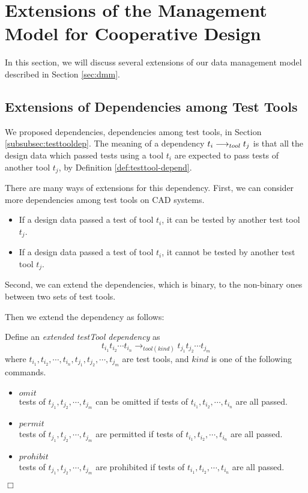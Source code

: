 \section{Extensions of the Management Model for Cooperative Design}
\label{sec:extension}
In this section, we will discuss several extensions of our data management
model described in Section \ref{sec:dmm}.

\subsection{Extensions of Dependencies among Test Tools}
\label{subsec:ext-testtooldep}
We proposed \testtool dependencies, dependencies among test tools,
in Section \ref{subsubsec:testtooldep}. 
The meaning of a \testtool dependency $t_i \longrightarrow_{tool} t_j$ is that 
all the design data which passed tests using a tool $t_i$ are expected to
pass tests of another tool $t_j$, by Definition
\ref{def:testtool-depend}.

There are many ways of extensions for this dependency.
First, we can consider more dependencies among test tools on CAD
systems.
\begin{itemize}
\item If a design data passed a test of tool $t_i$, it can be
tested by another test tool $t_j$.
\item If a design data passed a test of tool $t_i$, it cannot be 
tested by another test tool $t_j$.
\end{itemize}
Second, we can extend the dependencies, which is binary, to the non-binary
ones between two sets of test tools.

Then we extend the \testtool dependency as follows:
\begin{definition}
\label{def:ext-testtooldep}
Define an {\em extended testTool dependency} as
\[ t_{i_1}t_{i_2}\cdots t_{i_n} \longrightarrow_{tool(kind)} 
t_{j_1}t_{j_2}\cdots t_{j_m} \]
where $t_{i_1}, t_{i_2}, \cdots, t_{i_n}, t_{j_1}, t_{j_2}, \cdots,
t_{j_m}$ are test tools, and $kind$ is one of the following commands.
\begin{itemize}
\item $omit$\\
tests of $t_{j_1}, t_{j_2}, \cdots, t_{j_m}$ can be omitted if tests of
$t_{i_1}, t_{i_2}, \cdots, t_{i_n}$ are all passed.
\item $permit$\\
tests of $t_{j_1}, t_{j_2}, \cdots, t_{j_m}$ are permitted if tests of
$t_{i_1}, t_{i_2}, \cdots, t_{i_n}$ are all passed.
\item $prohibit$\\
tests of $t_{j_1}, t_{j_2}, \cdots, t_{j_m}$ are prohibited if tests
of $t_{i_1}, t_{i_2}, \cdots, t_{i_n}$ are all passed.
\end{itemize}\hfill$\Box$
\end{definition}

